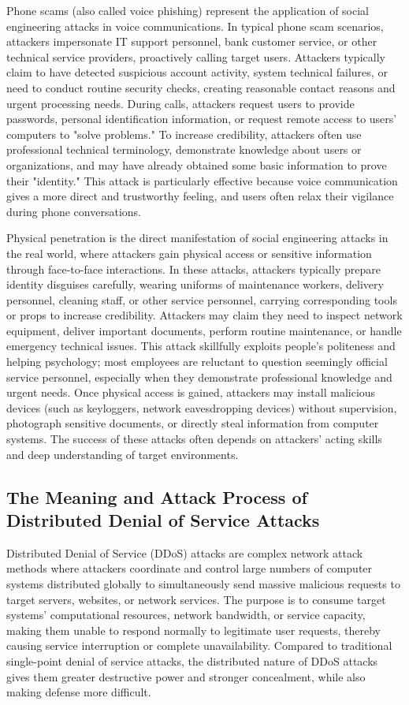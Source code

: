 \documentclass[12pt,a4paper]{article}
\begin{document}
Phone scams (also called voice phishing) represent the application of social engineering attacks in voice communications. In typical phone scam scenarios, attackers impersonate IT support personnel, bank customer service, or other technical service providers, proactively calling target users. Attackers typically claim to have detected suspicious account activity, system technical failures, or need to conduct routine security checks, creating reasonable contact reasons and urgent processing needs. During calls, attackers request users to provide passwords, personal identification information, or request remote access to users' computers to "solve problems." To increase credibility, attackers often use professional technical terminology, demonstrate knowledge about users or organizations, and may have already obtained some basic information to prove their "identity." This attack is particularly effective because voice communication gives a more direct and trustworthy feeling, and users often relax their vigilance during phone conversations.

Physical penetration is the direct manifestation of social engineering attacks in the real world, where attackers gain physical access or sensitive information through face-to-face interactions. In these attacks, attackers typically prepare identity disguises carefully, wearing uniforms of maintenance workers, delivery personnel, cleaning staff, or other service personnel, carrying corresponding tools or props to increase credibility. Attackers may claim they need to inspect network equipment, deliver important documents, perform routine maintenance, or handle emergency technical issues. This attack skillfully exploits people's politeness and helping psychology; most employees are reluctant to question seemingly official service personnel, especially when they demonstrate professional knowledge and urgent needs. Once physical access is gained, attackers may install malicious devices (such as keyloggers, network eavesdropping devices) without supervision, photograph sensitive documents, or directly steal information from computer systems. The success of these attacks often depends on attackers' acting skills and deep understanding of target environments.

\subsection{The Meaning and Attack Process of Distributed Denial of Service Attacks}

Distributed Denial of Service (DDoS) attacks are complex network attack methods where attackers coordinate and control large numbers of computer systems distributed globally to simultaneously send massive malicious requests to target servers, websites, or network services. The purpose is to consume target systems' computational resources, network bandwidth, or service capacity, making them unable to respond normally to legitimate user requests, thereby causing service interruption or complete unavailability. Compared to traditional single-point denial of service attacks, the distributed nature of DDoS attacks gives them greater destructive power and stronger concealment, while also making defense more difficult.
\end{document}
